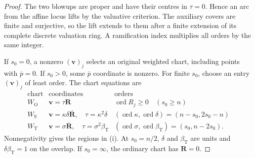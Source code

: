 \documentclass[11pt,a4paper]{article}
\numberwithin{equation}{section}
\theoremstyle{plain}
\theoremstyle{definition}
\theoremstyle{remark}
\begin{document}
\begin{proof}
The two blowups are proper and have their centres in $\tau=0$.
Hence an arc from the affine locus lifts by the valuative criterion.
The auxiliary covers are finite and surjective, so the lift extends
to them after a finite extension of its complete discrete valuation
ring. A ramification index multiplies all orders by the same integer.

If $s_0=0$, a nonzero $(\boldsymbol v)_j$ selects an original weighted chart,
including points with $\overline p=0$. If $s_0>0$, some
$\overline p$ coordinate is nonzero. For finite $s_0$, choose an entry
$(\boldsymbol v)_j$ of least order. The chart equations are
\[
\begin{array}{c|c|c}
\text{chart}&\text{coordinates}&\text{orders}\\ \hline
W_{\mathrm O}&\boldsymbol v=\tau\boldsymbol R
 &\operatorname{ord}R_j\ge0\quad(s_0\ge n)\\
W_{\mathrm S}&\boldsymbol v=\kappa\delta\overline{\boldsymbol R},\quad
              \tau=\kappa^2\delta
 &(\operatorname{ord}\kappa,\operatorname{ord}\delta)
       =(n-s_0,2s_0-n)\\
W_{\mathrm T}&\boldsymbol v=\sigma\overline{\boldsymbol R},\quad
              \tau=\sigma^2\beta_{\mathrm T}
 &(\operatorname{ord}\sigma,\operatorname{ord}\beta_{\mathrm T})
       =(s_0,n-2s_0).
\end{array}
\]
Nonnegativity gives the regions in \textup{(i)}. At $s_0=n/2$,
$\delta$ and $\beta_{\mathrm T}$ are units and $\delta\beta_{\mathrm T}=1$ on the overlap.
If $s_0=\infty$, the ordinary chart has $\boldsymbol R=0$.


\end{proof}
\end{document}
